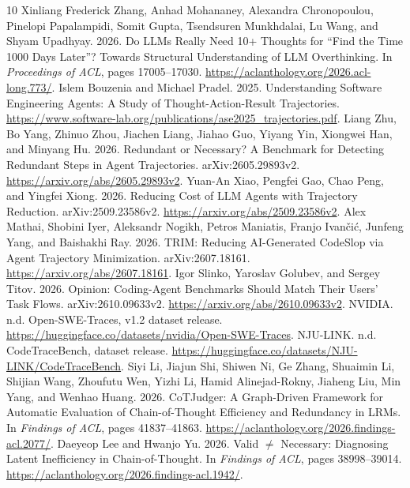 \documentclass[10pt,a4paper,twocolumn]{article}
\begin{document}
\begin{thebibliography}{10}
\small
{}
Xinliang Frederick Zhang, Anhad Mohananey, Alexandra Chronopoulou, Pinelopi Papalampidi, Somit Gupta, Tsendsuren Munkhdalai, Lu Wang, and Shyam Upadhyay. 2026.
\newblock Do LLMs Really Need 10+ Thoughts for ``Find the Time 1000 Days Later''? Towards Structural Understanding of LLM Overthinking.
\newblock In \emph{Proceedings of ACL}, pages 17005--17030. \url{https://aclanthology.org/2026.acl-long.773/}.
Islem Bouzenia and Michael Pradel. 2025.
\newblock Understanding Software Engineering Agents: A Study of Thought-Action-Result Trajectories.
\newblock \url{https://www.software-lab.org/publications/ase2025_trajectories.pdf}.
Liang Zhu, Bo Yang, Zhinuo Zhou, Jiachen Liang, Jiahao Guo, Yiyang Yin, Xiongwei Han, and Minyang Hu. 2026.
\newblock Redundant or Necessary? A Benchmark for Detecting Redundant Steps in Agent Trajectories.
\newblock arXiv:2605.29893v2. \url{https://arxiv.org/abs/2605.29893v2}.
Yuan-An Xiao, Pengfei Gao, Chao Peng, and Yingfei Xiong. 2026.
\newblock Reducing Cost of LLM Agents with Trajectory Reduction.
\newblock arXiv:2509.23586v2. \url{https://arxiv.org/abs/2509.23586v2}.
Alex Mathai, Shobini Iyer, Aleksandr Nogikh, Petros Maniatis, Franjo Ivan\v{c}i\'{c}, Junfeng Yang, and Baishakhi Ray. 2026.
\newblock TRIM: Reducing AI-Generated CodeSlop via Agent Trajectory Minimization.
\newblock arXiv:2607.18161. \url{https://arxiv.org/abs/2607.18161}.
Igor Slinko, Yaroslav Golubev, and Sergey Titov. 2026.
\newblock Opinion: Coding-Agent Benchmarks Should Match Their Users' Task Flows.
\newblock arXiv:2610.09633v2. \url{https://arxiv.org/abs/2610.09633v2}.
NVIDIA. n.d. Open-SWE-Traces, v1.2 dataset release.
\newblock \url{https://huggingface.co/datasets/nvidia/Open-SWE-Traces}.
NJU-LINK. n.d. CodeTraceBench, dataset release.
\newblock \url{https://huggingface.co/datasets/NJU-LINK/CodeTraceBench}.
Siyi Li, Jiajun Shi, Shiwen Ni, Ge Zhang, Shuaimin Li, Shijian Wang, Zhoufutu Wen, Yizhi Li, Hamid Alinejad-Rokny, Jiaheng Liu, Min Yang, and Wenhao Huang. 2026.
\newblock CoTJudger: A Graph-Driven Framework for Automatic Evaluation of Chain-of-Thought Efficiency and Redundancy in LRMs.
\newblock In \emph{Findings of ACL}, pages 41837--41863. \url{https://aclanthology.org/2026.findings-acl.2077/}.
Daeyeop Lee and Hwanjo Yu. 2026.
\newblock Valid $\neq$ Necessary: Diagnosing Latent Inefficiency in Chain-of-Thought.
\newblock In \emph{Findings of ACL}, pages 38998--39014. \url{https://aclanthology.org/2026.findings-acl.1942/}.
\end{thebibliography}
\end{document}

